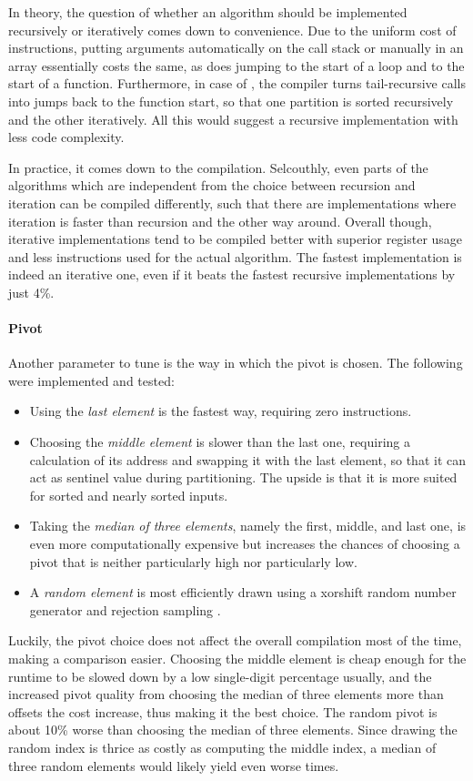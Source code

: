 In theory, the question of whether an algorithm should be implemented recursively or iteratively comes down to convenience.
Due to the uniform cost of instructions, putting arguments automatically on the call stack or manually in an array essentially costs the same, as does jumping to the start of a loop and to the start of a function.
Furthermore, in case of \QS{}, the compiler turns tail-recursive calls into jumps back to the function start, so that one partition is sorted recursively and the other iteratively.
All this would suggest a recursive implementation with less code complexity.

In practice, it comes down to the compilation.
Selcouthly, even parts of the algorithms which are independent from the choice between recursion and iteration can be compiled differently, such that there are implementations where iteration is faster than recursion and the other way around.
Overall though, iterative implementations tend to be compiled better with superior register usage and less instructions used for the actual \QS{} algorithm.
The fastest implementation is indeed an iterative one, even if it beats the fastest recursive implementations by just 4\%.

\paragraph{Pivot}
Another parameter to tune is the way in which the pivot is chosen.
The following were implemented and tested:
\begin{itemize}
	\item
	Using the \emph{last element} is the fastest way, requiring zero instructions.

	\item
	Choosing the \emph{middle element} is slower than the last one, requiring a calculation of its address and swapping it with the last element, so that it can act as sentinel value during partitioning.
	The upside is that it is more suited for sorted and nearly sorted inputs.

	\item
	Taking the \emph{median of three elements}, namely the first, middle, and last one, is even more computationally expensive but increases the chances of choosing a pivot that is neither particularly high nor particularly low.

	\item
	A \emph{random element} is most efficiently drawn using a xorshift random number generator and rejection sampling \cite{lukas_geis}.
\end{itemize}
Luckily, the pivot choice does not affect the overall compilation most of the time, making a comparison easier.
Choosing the middle element is cheap enough for the runtime to be slowed down by a low single-digit percentage usually, and the increased pivot quality from choosing the median of three elements more than offsets the cost increase, thus making it the best choice.
The random pivot is about 10\% worse than choosing the median of three elements.
Since drawing the random index is thrice as costly as computing the middle index, a median of three random elements would likely yield even worse times.
